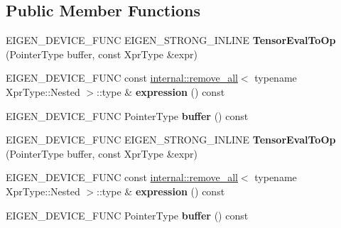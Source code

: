 \subsection*{Public Member Functions}
\begin{DoxyCompactItemize}
\item 
\mbox{\label{class_eigen_1_1_tensor_eval_to_op_a6238ee2a3065a404d3a59a1637aa8313}} 
E\+I\+G\+E\+N\+\_\+\+D\+E\+V\+I\+C\+E\+\_\+\+F\+U\+NC E\+I\+G\+E\+N\+\_\+\+S\+T\+R\+O\+N\+G\+\_\+\+I\+N\+L\+I\+NE {\bfseries Tensor\+Eval\+To\+Op} (Pointer\+Type buffer, const Xpr\+Type \&expr)
\item 
\mbox{\label{class_eigen_1_1_tensor_eval_to_op_a0a986994e1ea5114136ae17b08bf1d15}} 
E\+I\+G\+E\+N\+\_\+\+D\+E\+V\+I\+C\+E\+\_\+\+F\+U\+NC const \hyperlink{struct_eigen_1_1internal_1_1remove__all}{internal\+::remove\+\_\+all}$<$ typename Xpr\+Type\+::\+Nested $>$\+::type \& {\bfseries expression} () const
\item 
\mbox{\label{class_eigen_1_1_tensor_eval_to_op_aa6daefee5cf8675cb3e51bc004933f4d}} 
E\+I\+G\+E\+N\+\_\+\+D\+E\+V\+I\+C\+E\+\_\+\+F\+U\+NC Pointer\+Type {\bfseries buffer} () const
\item 
\mbox{\label{class_eigen_1_1_tensor_eval_to_op_a6238ee2a3065a404d3a59a1637aa8313}} 
E\+I\+G\+E\+N\+\_\+\+D\+E\+V\+I\+C\+E\+\_\+\+F\+U\+NC E\+I\+G\+E\+N\+\_\+\+S\+T\+R\+O\+N\+G\+\_\+\+I\+N\+L\+I\+NE {\bfseries Tensor\+Eval\+To\+Op} (Pointer\+Type buffer, const Xpr\+Type \&expr)
\item 
\mbox{\label{class_eigen_1_1_tensor_eval_to_op_a0a986994e1ea5114136ae17b08bf1d15}} 
E\+I\+G\+E\+N\+\_\+\+D\+E\+V\+I\+C\+E\+\_\+\+F\+U\+NC const \hyperlink{struct_eigen_1_1internal_1_1remove__all}{internal\+::remove\+\_\+all}$<$ typename Xpr\+Type\+::\+Nested $>$\+::type \& {\bfseries expression} () const
\item 
\mbox{\label{class_eigen_1_1_tensor_eval_to_op_aa6daefee5cf8675cb3e51bc004933f4d}} 
E\+I\+G\+E\+N\+\_\+\+D\+E\+V\+I\+C\+E\+\_\+\+F\+U\+NC Pointer\+Type {\bfseries buffer} () const
\end{DoxyCompactItemize}
